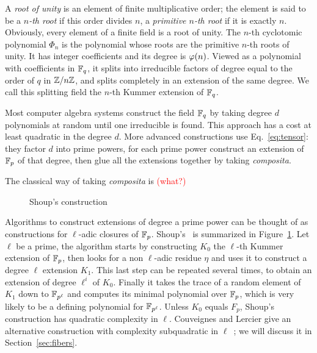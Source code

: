 \documentclass{sig-alternate}
\newcommand{\todo}[1]{\textcolor{red}{(#1)}}
\newcommand{\Cyc}{\Phi}  %
\begin{document}
A \emph{root of unity} is an element of finite multiplicative order;
the element is said to be a \emph{$n$-th root} if this order divides
$n$, a \emph{primitive $n$-th root} if it is exactly $n$. Obviously,
every element of a finite field is a root of unity. The $n$-th
cyclotomic polynomial $\Cyc_n$ is the polynomial whose roots are the
primitive $n$-th roots of unity. It has integer coefficients and its
degree is $\varphi(n)$. Viewed as a polynomial with coefficients in $\mathbb{F}_q$,
it splits into irreducible factors of degree equal to the order of $q$
in $\mathbb{Z}/n\mathbb{Z}$, and splits completely in an extension of the same
degree. We call this splitting field the $n$-th Kummer extension of
$\mathbb{F}_q$.

Most computer algebra systems construct the field $\mathbb{F}_q$ by taking
degree $d$ polynomials at random until one irreducible is found. This
approach has a cost at least quadratic in the degree $d$. More
advanced constructions use Eq.~\eqref{eq:tensor}: they factor $d$ into
prime powers, for each prime power construct an extension of $\mathbb{F}_p$ of
that degree, then glue all the extensions together by taking
\emph{composita}.

The classical way of taking \emph{composita} is \todo{what?}

\begin{figure}
  \centering
  \caption{Shoup's construction}
  \label{fig:shoup}
\end{figure}

Algorithms to construct extensions of degree a prime power can be
thought of as constructions for $\ell$-adic closures of
$\mathbb{F}_p$. Shoup's~\cite{shoup94} is summarized in
Figure~\ref{fig:shoup}. Let $\ell$ be a prime, the algorithm starts by
constructing $K_0$ the $\ell$-th Kummer extension of $\mathbb{F}_p$, then
looks for a non $\ell$-adic residue $\eta$ and uses it to construct a
degree $\ell$ extension $K_1$. This last step can be repeated several
times, to obtain an extension of degree $\ell^i$ of $K_0$. Finally it
takes the trace of a random element of $K_1$ down to $\mathbb{F}_{p^\ell}$ and
computes its minimal polynomial over $\mathbb{F}_p$, which is very likely to
be a defining polynomial for $\mathbb{F}_{p^\ell}$. Unless $K_0$ equals $F_p$,
Shoup's construction has quadratic complexity in $\ell$.  Couveignes
and Lercier give an alternative construction with complexity
subquadratic in $\ell$~\cite{couveignes+lercier11}; we will discuss it
in Section~\ref{sec:fibers}.
\end{document}
